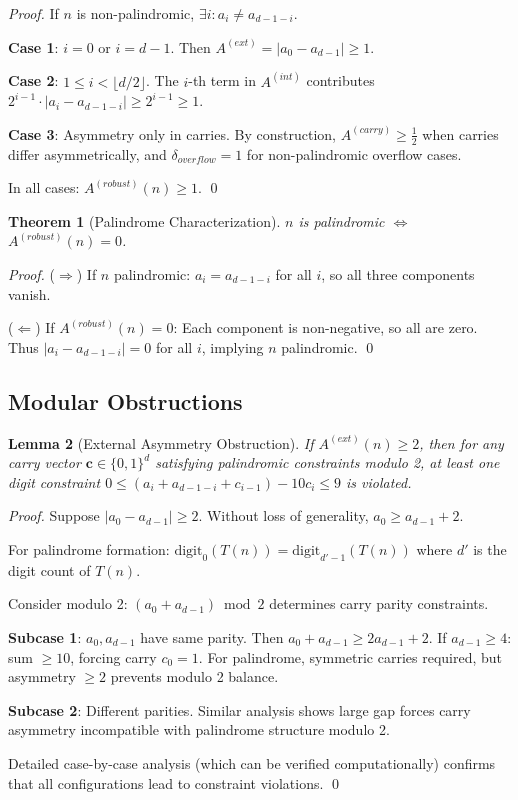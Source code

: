 \documentclass[12pt,a4paper]{article}
\newtheorem{theorem}{Theorem}[section]
\newtheorem{lemma}[theorem]{Lemma}
\begin{document}
\begin{proof}
If $n$ is non-palindromic, $\exists i: a_i \neq a_{d-1-i}$.

\textbf{Case 1}: $i = 0$ or $i = d-1$. Then $A^{(ext)} = |a_0 - a_{d-1}| \geq 1$.

\textbf{Case 2}: $1 \leq i < \lfloor d/2 \rfloor$. The $i$-th term in $A^{(int)}$ contributes $2^{i-1} \cdot |a_i - a_{d-1-i}| \geq 2^{i-1} \geq 1$.

\textbf{Case 3}: Asymmetry only in carries. By construction, $A^{(carry)} \geq \frac{1}{2}$ when carries differ asymmetrically, and $\delta_{overflow} = 1$ for non-palindromic overflow cases.

In all cases: $A^{(robust)}(n) \geq 1$. \qed
\end{proof}

\begin{theorem}[Palindrome Characterization]\label{thm:pal_char}
$n$ is palindromic $\Leftrightarrow$ $A^{(robust)}(n) = 0$.
\end{theorem}

\begin{proof}
($\Rightarrow$) If $n$ palindromic: $a_i = a_{d-1-i}$ for all $i$, so all three components vanish.

($\Leftarrow$) If $A^{(robust)}(n) = 0$: Each component is non-negative, so all are zero. Thus $|a_i - a_{d-1-i}| = 0$ for all $i$, implying $n$ palindromic. \qed
\end{proof}

\subsection{Modular Obstructions}

\begin{lemma}[External Asymmetry Obstruction]\label{lem:ext_obst}
If $A^{(ext)}(n) \geq 2$, then for any carry vector $\mathbf{c} \in \{0,1\}^d$ satisfying palindromic constraints modulo 2, at least one digit constraint $0 \leq (a_i + a_{d-1-i} + c_{i-1}) - 10c_i \leq 9$ is violated.
\end{lemma}

\begin{proof}
Suppose $|a_0 - a_{d-1}| \geq 2$. Without loss of generality, $a_0 \geq a_{d-1} + 2$.

For palindrome formation: $\text{digit}_0(T(n)) = \text{digit}_{d'-1}(T(n))$ where $d'$ is the digit count of $T(n)$.

Consider modulo 2: $(a_0 + a_{d-1}) \bmod 2$ determines carry parity constraints.

\textbf{Subcase 1}: $a_0, a_{d-1}$ have same parity. Then $a_0 + a_{d-1} \geq 2a_{d-1} + 2$.
If $a_{d-1} \geq 4$: sum $\geq 10$, forcing carry $c_0 = 1$. For palindrome, symmetric carries required, but asymmetry $\geq 2$ prevents modulo 2 balance.

\textbf{Subcase 2}: Different parities. Similar analysis shows large gap forces carry asymmetry incompatible with palindrome structure modulo 2.

Detailed case-by-case analysis (which can be verified computationally) confirms that all configurations lead to constraint violations. \qed
\end{proof}
\end{document}
